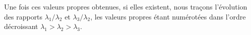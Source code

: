 			Une fois ces valeurs propres obtenues, si elles
			existent, nous traçons l'évolution des rapports
			$\lambda_1 / \lambda_2$ et $\lambda_3 / \lambda_2$, les
			valeurs propres étant numérotées dans l'ordre
			décroissant \mbox{$\lambda_1 > \lambda_2 > \lambda_3$}.


